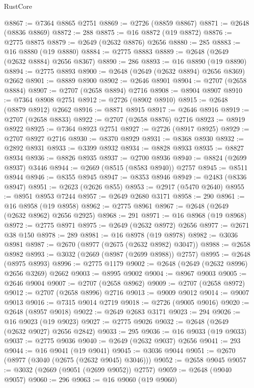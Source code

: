 \begin{lexlean}{RustCore}
\begin{coremodule}
@8867 := @7364 @8865 @2751
@8869 := @2726 (@8859 @8867)
@8871 := @2648 (@8836 @8869)
@8872 := 288
@8875 := @16 @8872 (@19 @8872)
@8876 := @2775 @8875
@8879 := @2649 (@2632 @8876) @2656
@8880 := 285
@8883 := @16 @8880 (@19 @8880)
@8884 := @2775 @8883
@8889 := @2648 (@2649 (@2632 @8884) @2656 @8367)
@8890 := 286
@8893 := @16 @8890 (@19 @8890)
@8894 := @2775 @8893
@8900 := @2648 (@2649 (@2632 @8894) @2656 @8369) @2662
@8901 := @8889 @8900
@8902 := @2646 @8901
@8904 := @2707 (@2658 @8884)
@8907 := @2707 (@2658 @8894) @2716
@8908 := @8904 @8907
@8910 := @7364 @8908 @2751
@8912 := @2726 (@8902 @8910)
@8915 := @2648 (@8879 @8912) @2662
@8916 := @8871 @8915
@8917 := @2646 @8916
@8919 := @2707 (@2658 @8833)
@8922 := @2707 (@2658 @8876) @2716
@8923 := @8919 @8922
@8925 := @7364 @8923 @2751
@8927 := @2726 (@8917 @8925)
@8929 := @2707 @8927 @2716
@8930 := @8370 @8929
@8931 := @8368 @8930
@8932 := @2892 @8931
@8933 := @3399 @8932
@8934 := @8828 @8933
@8935 := @8827 @8934
@8936 := @8826 @8935
@8937 := @2700 @8936
@8940 := @8824 (@2699 @8937) @3446
@8944 := @2669 (@8515 (@8583 @8940)) @2757
@8945 := @8511 @8944
@8946 := @8355 @8945
@8947 := @8353 @8946
@8949 := @2483 (@8336 @8947)
@8951 := @2623 (@2626 @855)
@8953 := @2917 (@5470 @2640)
@8955 := @8951 @8953 @7244
@8957 := @2649 @2680 @3171
@8958 := 290
@8961 := @16 @8958 (@19 @8958)
@8962 := @2775 @8961
@8967 := @2648 (@2649 (@2632 @8962) @2656 @2925)
@8968 := 291
@8971 := @16 @8968 (@19 @8968)
@8972 := @2775 @8971
@8975 := @2649 (@2632 @8972) @2656
@8977 := @2671 @38 @150
@8978 := 289
@8981 := @16 @8978 (@19 @8978)
@8982 := @3036 @8981
@8987 := @2670 (@8977 (@2675 (@2632 @8982) @3047))
@8988 := @2658 @8982
@8993 := @3032 (@2669 (@8987 (@2699 @8988)) @2757)
@8995 := @2648 (@8975 @8993)
@8996 := @2775 @1179
@9002 := @2648 (@2649 (@2632 @8996) @2656 @3269) @2662
@9003 := @8995 @9002
@9004 := @8967 @9003
@9005 := @2646 @9004
@9007 := @2707 (@2658 @8962)
@9009 := @2707 (@2658 @8972)
@9012 := @2707 (@2658 @8996) @2716
@9013 := @9009 @9012
@9014 := @9007 @9013
@9016 := @7315 @9014 @2719
@9018 := @2726 (@9005 @9016)
@9020 := @2648 (@8957 @9018)
@9022 := @2649 @2683 @3171
@9023 := 294
@9026 := @16 @9023 (@19 @9023)
@9027 := @2775 @9026
@9032 := @2648 (@2649 (@2632 @9027) @2656 @2842)
@9033 := 295
@9036 := @16 @9033 (@19 @9033)
@9037 := @2775 @9036
@9040 := @2649 (@2632 @9037) @2656
@9041 := 293
@9044 := @16 @9041 (@19 @9041)
@9045 := @3036 @9044
@9051 := @2670 (@8977 (@3040 (@2675 (@2632 @9045) @3046)))
@9052 := @2658 @9045
@9057 := @3032 (@2669 (@9051 (@2699 @9052)) @2757)
@9059 := @2648 (@9040 @9057)
@9060 := 296
@9063 := @16 @9060 (@19 @9060)

\end{coremodule}
\end{lexlean}
